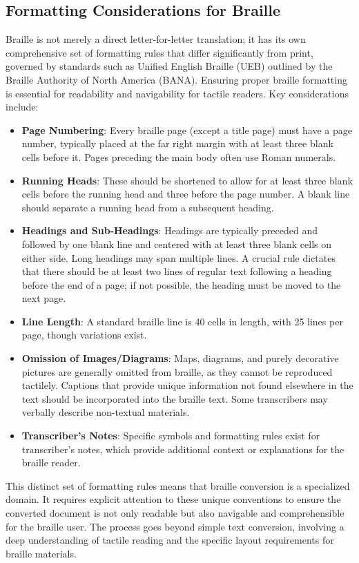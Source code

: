 \subsection{Formatting Considerations for Braille}
Braille is not merely a direct letter-for-letter translation; it has its own comprehensive set of formatting rules that differ significantly from print, governed by standards such as Unified English Braille (UEB) outlined by the Braille Authority of North America (BANA).\cite{ATAEMBrailleFormatting,TextToBraille} Ensuring proper braille formatting is essential for readability and navigability for tactile readers. Key considerations include:
\begin{itemize}
    \item \textbf{Page Numbering}: Every braille page (except a title page) must have a page number, typically placed at the far right margin with at least three blank cells before it.\cite{BRLFormat} Pages preceding the main body often use Roman numerals.\cite{BRLFormat}
    \item \textbf{Running Heads}: These should be shortened to allow for at least three blank cells before the running head and three before the page number.\cite{BRLFormat} A blank line should separate a running head from a subsequent heading.\cite{BRLFormat}
    \item \textbf{Headings and Sub-Headings}: Headings are typically preceded and followed by one blank line and centered with at least three blank cells on either side.\cite{BRLFormat} Long headings may span multiple lines.\cite{BRLFormat} A crucial rule dictates that there should be at least two lines of regular text following a heading before the end of a page; if not possible, the heading must be moved to the next page.\cite{BRLFormat}
    \item \textbf{Line Length}: A standard braille line is 40 cells in length, with 25 lines per page, though variations exist.\cite{BRLFormat}
    \item \textbf{Omission of Images/Diagrams}: Maps, diagrams, and purely decorative pictures are generally omitted from braille, as they cannot be reproduced tactilely.\cite{BRLFormat} Captions that provide unique information not found elsewhere in the text should be incorporated into the braille text.\cite{BRLFormat} Some transcribers may verbally describe non-textual materials.\cite{BRLFormat}
    \item \textbf{Transcriber's Notes}: Specific symbols and formatting rules exist for transcriber's notes, which provide additional context or explanations for the braille reader.\cite{BRLFormat}
\end{itemize}
This distinct set of formatting rules means that braille conversion is a specialized domain. It requires explicit attention to these unique conventions to ensure the converted document is not only readable but also navigable and comprehensible for the braille user. The process goes beyond simple text conversion, involving a deep understanding of tactile reading and the specific layout requirements for braille materials.

